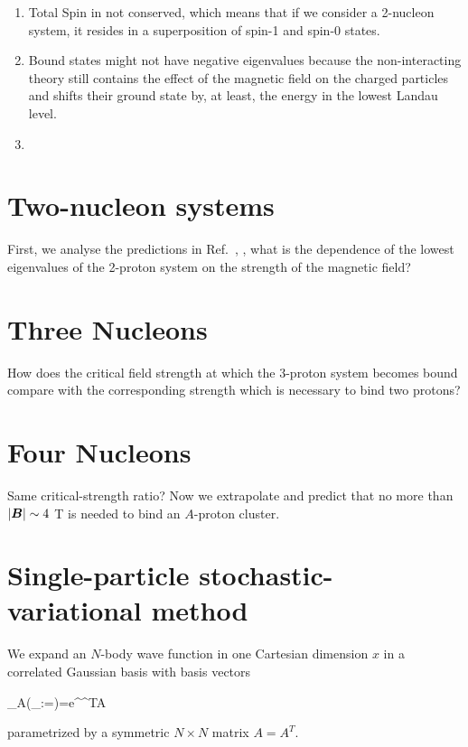 \documentclass[aps,prd,onecolumn
,tightenlines,letterpaper,notitlepage,
nofootinbib]{revtex4-1}
\begin{document}
\begin{enumerate}
\item Total Spin in not conserved, which means that if we consider a 2-nucleon
system, it resides in a superposition of spin-1 and spin-0 states.
\item Bound states might not have negative eigenvalues because the non-interacting
theory still contains the effect of the magnetic field on the charged particles
and shifts their ground state by, at least, the energy in the lowest Landau level.
\item
\end{enumerate}

\section{Two-nucleon systems}

First, we analyse the predictions in Ref.~\cite{PhysRevLett.116.112301}, \ie, what is
the dependence of the lowest eigenvalues of the 2-proton system on the strength of the
magnetic field?

\section{Three Nucleons}

How does the critical field strength at which the 3-proton system becomes bound compare
with the corresponding strength which is necessary to bind two protons?

\section{Four Nucleons}

Same critical-strength ratio? Now we extrapolate and predict that no more than 
$\vert\boldsymbol{B}\vert\sim 4~$T is needed to bind an $A$-proton cluster.

\appendix*
\section{Single-particle stochastic-variational method}
We expand an $N$-body wave function in one Cartesian dimension $x$ in a correlated Gaussian basis with
basis vectors

\be{}
\phi_A(_{:=})=e^{^TA}
\ee

parametrized by a symmetric $N\times N$ matrix $A=A^T$.


\end{document}
